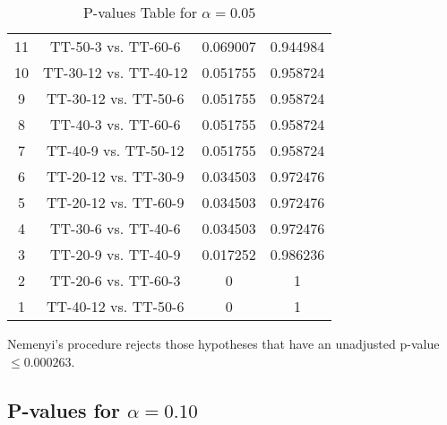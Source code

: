 \documentclass[a4paper,10pt]{article}
\begin{document}
\begin{landscape}
\begin{table}[!htp]
\begin{tabular}{cccc}
11&TT-50-3 vs. TT-60-6&0.069007&0.944984\\
10&TT-30-12 vs. TT-40-12&0.051755&0.958724\\
9&TT-30-12 vs. TT-50-6&0.051755&0.958724\\
8&TT-40-3 vs. TT-60-6&0.051755&0.958724\\
7&TT-40-9 vs. TT-50-12&0.051755&0.958724\\
6&TT-20-12 vs. TT-30-9&0.034503&0.972476\\
5&TT-20-12 vs. TT-60-9&0.034503&0.972476\\
4&TT-30-6 vs. TT-40-6&0.034503&0.972476\\
3&TT-20-9 vs. TT-40-9&0.017252&0.986236\\
2&TT-20-6 vs. TT-60-3&0&1\\
1&TT-40-12 vs. TT-50-6&0&1\\
\hline
\end{tabular}
\caption{P-values Table for $\alpha=0.05$}
\end{table}Nemenyi's procedure rejects those hypotheses that have an unadjusted p-value $\le0.000263$.

\pagebreak

\subsection{P-values for $\alpha=0.10$}


\end{landscape}
\end{document}
